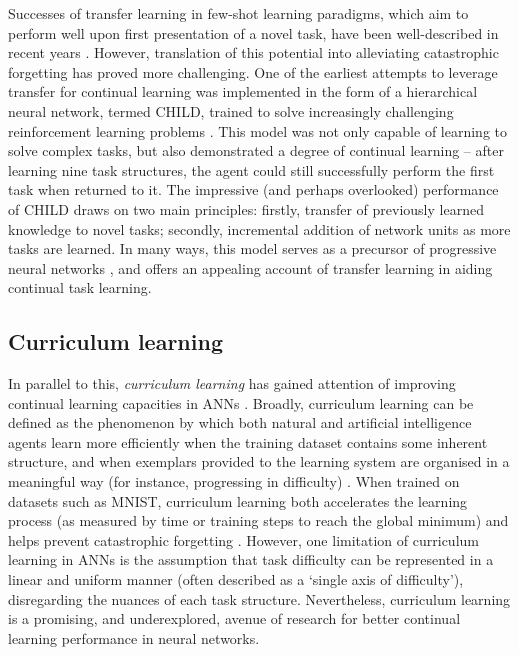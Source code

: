 \documentclass{article} %
\begin{document}
Successes of transfer learning in few-shot learning paradigms, which aim to perform well upon first presentation of a novel task, have been well-described in recent years \citep{palatucci2009zero,vinyals2016matching}. However, translation of this potential into alleviating catastrophic forgetting has proved more challenging. One of the earliest attempts to leverage transfer for continual learning was implemented in the form of a hierarchical neural network, termed CHILD, trained to solve increasingly challenging reinforcement learning problems \citep{ring1998child}. This model was not only capable of learning to solve complex tasks, but also demonstrated a degree of continual learning – after learning nine task structures, the agent could still successfully perform the first task when returned to it. The impressive (and perhaps overlooked) performance of CHILD draws on two main principles: firstly, transfer of previously learned knowledge to novel tasks; secondly, incremental addition of network units as more tasks are learned. In many ways, this model serves as a precursor of progressive neural networks \citep{rusu2016progressive}, and offers an appealing account of transfer learning in aiding continual task learning.

\subsection*{Curriculum learning}

In parallel to this, \textit{curriculum learning} has gained attention of improving continual learning capacities in ANNs \citep{bengio2009curriculum,graves2016hybrid}. Broadly, curriculum learning can be defined as the phenomenon by which both natural and artificial intelligence agents learn more efficiently when the training dataset contains some inherent structure, and when exemplars provided to the learning system are organised in a meaningful way (for instance, progressing in difficulty) \citep{bengio2009curriculum}. When trained on datasets such as MNIST, curriculum learning both accelerates the learning process (as measured by time or training steps to reach the global minimum) and helps prevent catastrophic forgetting \citep{bengio2009curriculum}. However, one limitation of curriculum learning in ANNs is the assumption that task difficulty can be represented in a linear and uniform manner (often described as a ‘single axis of difficulty’), disregarding the nuances of each task structure. Nevertheless, curriculum learning is a promising, and underexplored, avenue of research for better continual learning performance in neural networks.
\end{document}
